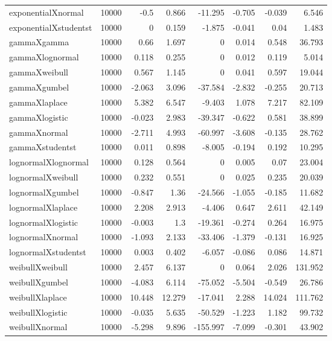\begin{table}[!htbp]
{\begin{tabular}{lrrrrrrr}
exponentialXnormal & 10000 & -0.5 & 0.866 & -11.295 & -0.705 & -0.039 & 6.546 \\ 
exponentialXstudentst & 10000 & 0 & 0.159 & -1.875 & -0.041 & 0.04 & 1.483 \\ 
gammaXgamma & 10000 & 0.66 & 1.697 & 0 & 0.014 & 0.548 & 36.793 \\ 
gammaXlognormal & 10000 & 0.118 & 0.255 & 0 & 0.012 & 0.119 & 5.014 \\ 
gammaXweibull & 10000 & 0.567 & 1.145 & 0 & 0.041 & 0.597 & 19.044 \\ 
gammaXgumbel & 10000 & -2.063 & 3.096 & -37.584 & -2.832 & -0.255 & 20.713 \\ 
gammaXlaplace & 10000 & 5.382 & 6.547 & -9.403 & 1.078 & 7.217 & 82.109 \\ 
gammaXlogistic & 10000 & -0.023 & 2.983 & -39.347 & -0.622 & 0.581 & 38.899 \\ 
gammaXnormal & 10000 & -2.711 & 4.993 & -60.997 & -3.608 & -0.135 & 28.762 \\ 
gammaXstudentst & 10000 & 0.011 & 0.898 & -8.005 & -0.194 & 0.192 & 10.295 \\ 
lognormalXlognormal & 10000 & 0.128 & 0.564 & 0 & 0.005 & 0.07 & 23.004 \\ 
lognormalXweibull & 10000 & 0.232 & 0.551 & 0 & 0.025 & 0.235 & 20.039 \\ 
lognormalXgumbel & 10000 & -0.847 & 1.36 & -24.566 & -1.055 & -0.185 & 11.682 \\ 
lognormalXlaplace & 10000 & 2.208 & 2.913 & -4.406 & 0.647 & 2.611 & 42.149 \\ 
lognormalXlogistic & 10000 & -0.003 & 1.3 & -19.361 & -0.274 & 0.264 & 16.975 \\ 
lognormalXnormal & 10000 & -1.093 & 2.133 & -33.406 & -1.379 & -0.131 & 16.925 \\ 
lognormalXstudentst & 10000 & 0.003 & 0.402 & -6.057 & -0.086 & 0.086 & 14.871 \\ 
weibullXweibull & 10000 & 2.457 & 6.137 & 0 & 0.064 & 2.026 & 131.952 \\ 
weibullXgumbel & 10000 & -4.083 & 6.114 & -75.052 & -5.504 & -0.549 & 26.786 \\ 
weibullXlaplace & 10000 & 10.448 & 12.279 & -17.041 & 2.288 & 14.024 & 111.762 \\ 
weibullXlogistic & 10000 & -0.035 & 5.635 & -50.529 & -1.223 & 1.182 & 99.732 \\ 
weibullXnormal & 10000 & -5.298 & 9.896 & -155.997 & -7.099 & -0.301 & 43.902 \\ 

\end{tabular}}
\end{table}
